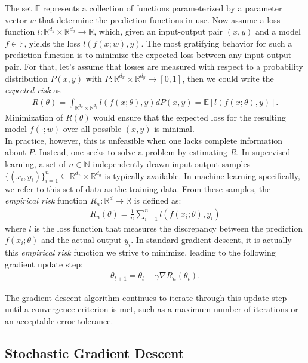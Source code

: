 The set \(\mathbb{F}\) represents a collection of functions parameterized by a parameter vector \( w \) that determine the prediction functions in use.
Now assume a loss function \( l : \mathbb{R}^{d_y} \times \mathbb{R}^{d_y} \to \mathbb{R} \), which, given an input-output pair \((x, y)\) and a model $f \in \mathbb{F}$, yields the loss \( l(f(x; w), y) \).
The most gratifying behavior for such a prediction function is to minimize the expected loss between any input-output pair.
For that, let's assume that losses are measured with respect to a probability distribution $P(x,y)$ with $ P : \mathbb{R}^{d_x} \times \mathbb{R}^{d_y} \to [0, 1] $,
then we could write the \emph{expected risk} as
\begin{align}
R(\theta) = \int_{\mathbb{R}^{d_x} \times \mathbb{R}^{d_y}} l(f(x; \theta), y) dP(x, y) = \mathbb{E}[l(f(x; \theta), y)].
\end{align}
Minimization of $R(\theta)$ would ensure that the expected loss for the resulting model $f(\cdot; w) $ over all possible $(x, y)$ is minimal.\\
In practice, however, this is unfeasible when one lacks complete information about $P$.
Instead, one seeks to solve a problem by estimating \( R \).
In supervised learning, a set of \( n \in \mathbb{N} \) independently drawn input-output
samples \(\{ (x_i, y_i) \}_{i=1}^{n} \subseteq \mathbb{R}^{d_x} \times \mathbb{R}^{d_y}\) is typically available.
In machine learning specifically, we refer to this set of data as the training data.
From these samples, the \emph{empirical risk} function \( R_n : \mathbb{R}^d \to \mathbb{R} \) is defined as:
\begin{align}
R_n(\theta) = \frac{1}{n} \sum_{i=1}^{n} l(f(x_i; \theta), y_i)
\end{align}
where \( l \) is the loss function that measures the discrepancy between the prediction \( f(x_i; \theta) \) and the actual output \( y_i \).
In standard gradient descent, it is actually this \emph{empirical risk} function we strive to minimize, leading to the following gradient update step:
\begin{align}
    \theta_{t+1} = \theta_t - \gamma \nabla R_n(\theta_t).
\end{align}

The gradient descent algorithm continues to iterate through this update step until a convergence criterion is met, such as a maximum number of iterations or an acceptable error tolerance.
\subsection{Stochastic Gradient Descent}
\label{sec:sgd}

